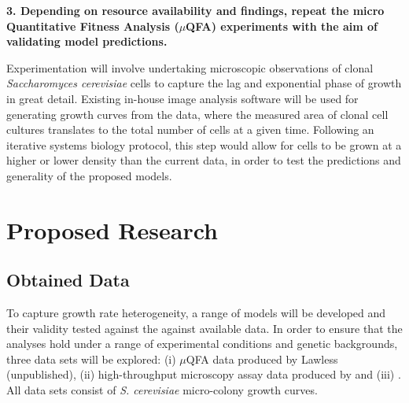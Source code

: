 \documentclass{bioinfo}
\begin{document}

\textbf{3. Depending on resource availability and findings, repeat the micro Quantitative Fitness Analysis ($\mu$QFA) experiments with the aim of validating model predictions.}
\begin{addmargin}[1.5em]{1.5em}
Experimentation will involve undertaking microscopic observations of clonal \textit{Saccharomyces cerevisiae} cells to capture the lag and exponential phase of growth in great detail. Existing in-house image analysis software will be used for generating growth curves from the data, where the measured area of clonal cell cultures translates to the total number of cells at a given time. Following an iterative systems biology protocol, this step would allow for cells to be grown at a higher or lower density than the current data, in order to test the predictions and generality of the proposed models. 
\end{addmargin}

\section{Proposed Research}

\subsection{Obtained Data}

To capture growth rate heterogeneity, a range of models will be developed and their validity tested against the against available data. In order to ensure that the analyses hold under a range of experimental conditions and genetic backgrounds, three data sets will be explored: (i) $\mu$QFA data produced by Lawless (unpublished), (ii) high-throughput microscopy assay data produced by \citealp{Levy12} and (iii) \citealp{Ziv13}. All data sets consist of \textit{S. cerevisiae} micro-colony growth curves.
\end{document}
